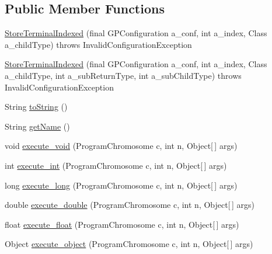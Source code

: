 \subsection*{Public Member Functions}
\begin{DoxyCompactItemize}
\item 
\hyperlink{classorg_1_1jgap_1_1gp_1_1function_1_1_store_terminal_indexed_a4abf4e4306b4387747a416bd5fc7d7be}{Store\-Terminal\-Indexed} (final G\-P\-Configuration a\-\_\-conf, int a\-\_\-index, Class a\-\_\-child\-Type)  throws Invalid\-Configuration\-Exception 
\item 
\hyperlink{classorg_1_1jgap_1_1gp_1_1function_1_1_store_terminal_indexed_a7f12b8150f632f7372cecbe9993d7c43}{Store\-Terminal\-Indexed} (final G\-P\-Configuration a\-\_\-conf, int a\-\_\-index, Class a\-\_\-child\-Type, int a\-\_\-sub\-Return\-Type, int a\-\_\-sub\-Child\-Type)  throws Invalid\-Configuration\-Exception 
\item 
String \hyperlink{classorg_1_1jgap_1_1gp_1_1function_1_1_store_terminal_indexed_a4e0bdb86cfe2a0ff04693dea9a8cca66}{to\-String} ()
\item 
String \hyperlink{classorg_1_1jgap_1_1gp_1_1function_1_1_store_terminal_indexed_ab5bb97846fe3ca3ea3887913cbba2432}{get\-Name} ()
\item 
void \hyperlink{classorg_1_1jgap_1_1gp_1_1function_1_1_store_terminal_indexed_a2805dc773fb249b804df72e442e0926e}{execute\-\_\-void} (Program\-Chromosome c, int n, Object\mbox{[}$\,$\mbox{]} args)
\item 
int \hyperlink{classorg_1_1jgap_1_1gp_1_1function_1_1_store_terminal_indexed_aaa831a0e4f9b0956e2ab1ea9f02787fd}{execute\-\_\-int} (Program\-Chromosome c, int n, Object\mbox{[}$\,$\mbox{]} args)
\item 
long \hyperlink{classorg_1_1jgap_1_1gp_1_1function_1_1_store_terminal_indexed_a1a4e42d3965a832b1f5ad1a872f09afc}{execute\-\_\-long} (Program\-Chromosome c, int n, Object\mbox{[}$\,$\mbox{]} args)
\item 
double \hyperlink{classorg_1_1jgap_1_1gp_1_1function_1_1_store_terminal_indexed_af7c6253614abed661d2cdeb3e2d591e5}{execute\-\_\-double} (Program\-Chromosome c, int n, Object\mbox{[}$\,$\mbox{]} args)
\item 
float \hyperlink{classorg_1_1jgap_1_1gp_1_1function_1_1_store_terminal_indexed_a64b77463141ecfe07209a7c0f8146c0a}{execute\-\_\-float} (Program\-Chromosome c, int n, Object\mbox{[}$\,$\mbox{]} args)
\item 
Object \hyperlink{classorg_1_1jgap_1_1gp_1_1function_1_1_store_terminal_indexed_a5d022255d93027a39de05b9c19ae40a3}{execute\-\_\-object} (Program\-Chromosome c, int n, Object\mbox{[}$\,$\mbox{]} args)

\end{DoxyCompactItemize}

